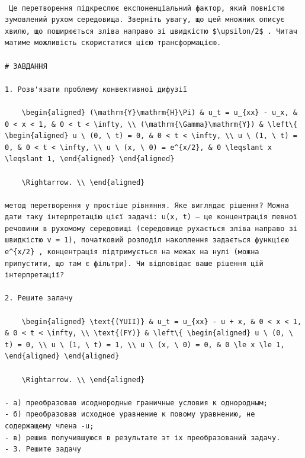 \documentclass[
  ukrainian,
]{article}
\begin{document}
\begin{verbatim}

 Це перетворення підкреслює експоненціальний фактор, який повністю зумовлений рухом середовища. Зверніть увагу, що цей множник описує хвилю, що поширюється зліва направо зі швидкістю $\upsilon/2$ . Читач матиме можливість скористатися цією трансформацією.

# ЗАВДАННЯ

1. Розв'язати проблему конвективної дифузії

    \begin{aligned} (\mathrm{Y}\mathrm{H}\Pi) & u_t = u_{xx} - u_x, & 0 < x < 1, & 0 < t < \infty, \\ (\mathrm{\Gamma}\mathrm{Y}) & \left\{ \begin{aligned} u \ (0, \ t) = 0, & 0 < t < \infty, \\ u \ (1, \ t) = 0, & 0 < t < \infty, \\ u \ (x, \ 0) = e^{x/2}, & 0 \leqslant x \leqslant 1, \end{aligned} \end{aligned}

    \Rightarrow. \\ \end{aligned}

метод перетворення у простіше рівняння. Яке виглядає рішення? Можна дати таку інтерпретацію цієї задачі: u(x, t) — це концентрація певної речовини в рухомому середовищі (середовище рухається зліва направо зі швидкістю v = 1), початковий розподіл накоплення задається функцією e^{x/2} , концентрація підтримується на межах на нулі (можна припустити, що там є фільтри). Чи відповідає ваше рішення цій інтерпретації?

2. Решите залачу

    \begin{aligned} \text{(YUII)} & u_t = u_{xx} - u + x, & 0 < x < 1, & 0 < t < \infty, \\ \text{(FY)} & \left\{ \begin{aligned} u \ (0, \ t) = 0, \\ u \ (1, \ t) = 1, \\ u \ (x, \ 0) = 0, & 0 \le x \le 1, \end{aligned} \end{aligned}

    \Rightarrow. \\ \end{aligned}

- а) преобразовав исоднородные граничные условия к однородным;
- б) преобразовав исходное уравнение к повому уравнению, не содержащему члена -u;
- в) решив получившуюся в результате эт іх преобразований задачу.
- 3. Решите задачу


\end{verbatim}
\end{document}
